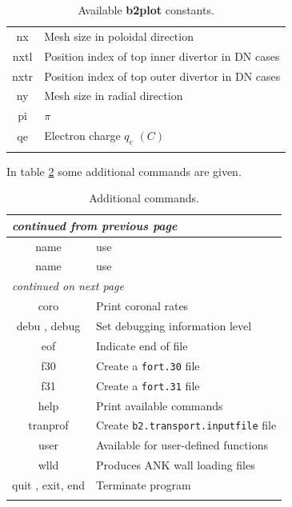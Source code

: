 \documentclass[a4paper,10pt]{report}
\newcommand{\btwoplot}{{\bf b2plot} }
\begin{document}
\begin{center}
\begin{longtable}{|c|l|}
    nx \index{b2plot, nx}     & Mesh size in poloidal direction \\
    nxtl \index{b2plot, nxtl}   & Position index of top inner divertor in DN cases \\
    nxtr \index{b2plot, nxtr}   & Position index of top outer divertor in DN cases \\
    ny \index{b2plot, ny}     & Mesh size in radial direction \\
    pi \index{b2plot, pi}     & $\pi$ \\
    qe \index{b2plot, qe}     & Electron charge $q_e$ $(C)$ \\
    \hline
    \caption{Available \btwoplot constants.}
    \label{tab:b2plotconstants}
  \end{longtable}
\end{center}

In table \ref{tab:extracommands} some additional commands are given.

\begin{center}
  \begin{longtable}{|c|l|}
    \hline
    \multicolumn{2}{|l|}{\small\sl continued from previous page} \\
    \hline name & use \\
    \hline \endhead
    \hline name & use \\
    \hline \endfirsthead
    \hline
    \multicolumn{2}{|l|}{\small\sl continued on next page} \\
    \hline \endfoot
    \endlastfoot
    coro \index{b2plot, coro}        & Print coronal rates \\
    debu \index{b2plot, debu}, debug \index{b2plot, debug} & Set debugging information level \\
    eof \index{b2plot, eof}         & Indicate end of file \\
    f30 \index{b2plot, f30}         & Create a {\tt fort.30} file \\
    f31 \index{b2plot, f31}         & Create a {\tt fort.31} file \\
    help \index{b2plot, help}        & Print available commands \\
    tranprof \index{b2plot, tranprof}    & Create {\tt b2.transport.inputfile} file\index{b2.transport.inputfile} \\
    user \index{b2plot, user}        & Available for user-defined functions \\
    wlld \index{b2plot, wlld}        & Produces ANK wall loading files \\
    quit \index{b2plot, quit}, exit, end \index{b2plot, exit}\index{b2plot, end} & Terminate program \\
    \hline
    \caption{Additional commands.}
    \label{tab:extracommands}
  \end{longtable}
\end{center}
\end{document}
